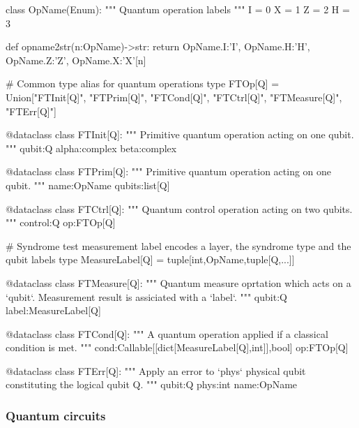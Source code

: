   \begin{python}
  class OpName(Enum):
    """ Quantum operation labels """
    I = 0
    X = 1
    Z = 2
    H = 3

  def opname2str(n:OpName)->str:
    return {OpName.I:'I', OpName.H:'H', OpName.Z:'Z', OpName.X:'X'}[n]

  # Common type alias for quantum operations
  type FTOp[Q] = Union["FTInit[Q]", "FTPrim[Q]", "FTCond[Q]", "FTCtrl[Q]", "FTMeasure[Q]",
                       "FTErr[Q]"]

  @dataclass
  class FTInit[Q]:
    """ Primitive quantum operation acting on one qubit. """
    qubit:Q
    alpha:complex
    beta:complex

  @dataclass
  class FTPrim[Q]:
    """ Primitive quantum operation acting on one qubit. """
    name:OpName
    qubits:list[Q]

  @dataclass
  class FTCtrl[Q]:
    """ Quantum control operation acting on two qubits. """
    control:Q
    op:FTOp[Q]

  # Syndrome test measurement label encodes a layer, the syndrome type and the qubit labels
  type MeasureLabel[Q] = tuple[int,OpName,tuple[Q,...]]

  @dataclass
  class FTMeasure[Q]:
    """ Quantum measure oprtation which acts on a `qubit`. Measurement result is assiciated with a
    `label`. """
    qubit:Q
    label:MeasureLabel[Q]

  @dataclass
  class FTCond[Q]:
    """ A quantum operation applied if a classical condition is met. """
    cond:Callable[[dict[MeasureLabel[Q],int]],bool]
    op:FTOp[Q]

  @dataclass
  class FTErr[Q]:
    """ Apply an error to `phys` physical qubit constituting the logical qubit Q. """
    qubit:Q
    phys:int
    name:OpName
  \end{python}

\subsubsection{Quantum circuits}

